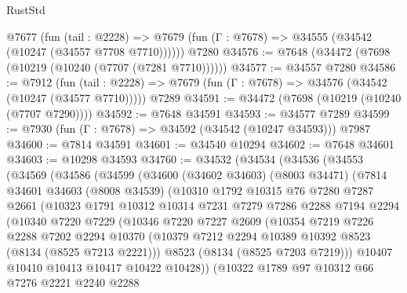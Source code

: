 \begin{lexlean}{RustStd}
\begin{coremodule}
{\begin{coremodule}
{{{{{{{{{{{{{{{{{{{{{{{{{{{{{{{{{{{{{{{{{{{{{{{{{{{{{    @7677
      (fun (tail : @2228) =>
      @7679 (fun (Γ : @7678) => @34555 (@34542 (@10247 (@34557 @7708 @7710))))))
    @7280
@34576 := @7648 (@34472 (@7698 (@10219 (@10240 (@7707 (@7281 @7710))))))
@34577 := @34557 @7280
@34586 := @7912
    (fun (tail : @2228) => @7679 (fun (Γ : @7678) => @34576 (@34542 (@10247 (@34577 @7710)))))
    @7289
@34591 := @34472 (@7698 (@10219 (@10240 (@7707 @7290))))
@34592 := @7648 @34591
@34593 := @34577 @7289
@34599 := @7930 (fun (Γ : @7678) => @34592 (@34542 (@10247 @34593))) @7987
@34600 := @7814 @34591
@34601 := @34540 @10294
@34602 := @7648 @34601
@34603 := @10298 @34593
@34760 := @34532
    (@34534
      (@34536
        (@34553
          (@34569
            (@34586
              (@34599
                (@34600
                  (@34602 @34603)
                  (@8003 @34471)
                  (@7814
                    @34601
                    @34603
                    (@8008 @34539)
                    (@10310
                      @1792
                      @10315
                      @76
                      @7280
                      @7287
                      @2661
                      (@10323
                        @1791
                        @10312
                        @10314
                        @7231
                        @7279
                        @7286
                        @2288
                        @7194
                        @2294
                        (@10340
                          @7220
                          @7229
                          (@10346
                            @7220
                            @7227
                            @2609
                            (@10354
                              @7219
                              @7226
                              @2288
                              @7202
                              @2294
                              @10370
                              (@10379 @7212 @2294 @10389 @10392 @8523 (@8134 (@8525 @7213 @2221)))
                              @8523
                              (@8134 (@8525 @7203 @7219)))
                            @10407
                            @10410
                            @10413
                            @10417
                            @10422
                            @10428))
                        (@10322
                          @1789
                          @97
                          @10312
                          @66
                          @7276
                          @2221
                          @2240
                          @2288
}}}}}}}}}}}}}}}}}}}}}}}}}}}}}}}}}}}}}}}}}}}}}}}}}}}}}
\end{coremodule}}
\end{coremodule}
\end{lexlean}
